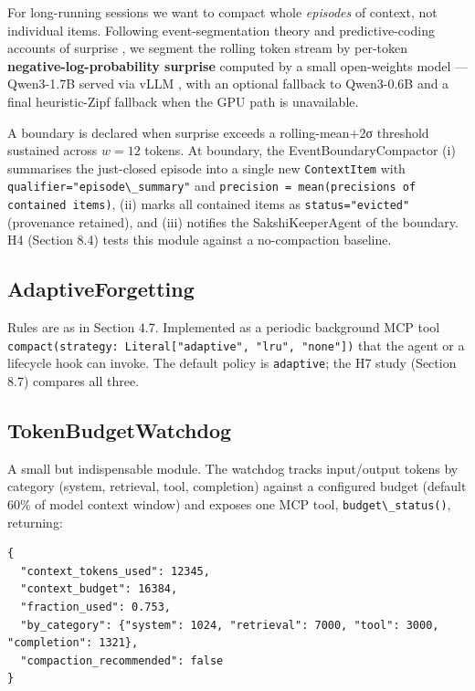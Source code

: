 For long-running sessions we want to compact whole \emph{episodes} of context, not individual items. Following event-segmentation theory \citep{zacks2007event, baldassano2017nested} and predictive-coding accounts of surprise \citep{rao1999predictive, friston2010fep, feldman2010precision}, we segment the rolling token stream by per-token \textbf{negative-log-probability surprise} computed by a small open-weights model --- Qwen3-1.7B served via vLLM \citep{kwon2023vllm, vllm2023, qwen2024technical}, with an optional fallback to Qwen3-0.6B and a final heuristic-Zipf fallback \citep{piantadosi2014zipf, shannon1948mathematical, mackay2003information} when the GPU path is unavailable.

A boundary is declared when surprise exceeds a rolling-mean+2σ threshold sustained across \(w=12\) tokens. At boundary, the EventBoundaryCompactor (i) summarises the just-closed episode into a single new \passthrough{\lstinline!ContextItem!} with \passthrough{\lstinline!qualifier="episode\_summary"!} and \passthrough{\lstinline!precision = mean(precisions of contained items)!}, (ii) marks all contained items as \passthrough{\lstinline!status="evicted"!} (provenance retained), and (iii) notifies the SakshiKeeperAgent of the boundary. H4 (Section 8.4) tests this module against a no-compaction baseline.

\subsection{AdaptiveForgetting}\label{adaptiveforgetting}

Rules are as in Section 4.7. Implemented as a periodic background MCP tool \passthrough{\lstinline!compact(strategy: Literal["adaptive", "lru", "none"])!} that the agent or a lifecycle hook can invoke. The default policy is \passthrough{\lstinline!adaptive!}; the H7 study (Section 8.7) compares all three.

\subsection{TokenBudgetWatchdog}\label{tokenbudgetwatchdog}

A small but indispensable module. The watchdog tracks input/output tokens by category (system, retrieval, tool, completion) against a configured budget (default 60\% of model context window) and exposes one MCP tool, \passthrough{\lstinline!budget\_status()!}, returning:

\begin{lstlisting}
{
  "context_tokens_used": 12345,
  "context_budget": 16384,
  "fraction_used": 0.753,
  "by_category": {"system": 1024, "retrieval": 7000, "tool": 3000, "completion": 1321},
  "compaction_recommended": false
}
\end{lstlisting}

